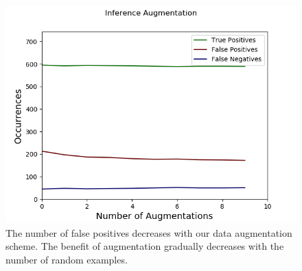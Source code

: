 \begin{figure}[t]
	\centering
	\includegraphics[width=0.45\linewidth]{./figures/Kasthuri-test-augmentation.png}
	\caption{The number of false positives decreases with our data augmentation scheme. The benefit of augmentation gradually decreases with the number of random examples.}
	\label{fig:test-augmentation}
\end{figure}
